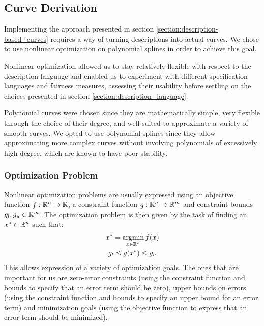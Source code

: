 \documentclass[a4paper]{article}
\begin{document}
		\subsection{Curve Derivation}
		\label{section:curve_derivation}

			Implementing the approach presented in section \ref{section:description-based_curves} requires a way of turning descriptions into actual curves. We chose to use nonlinear optimization on polynomial splines in order to achieve this goal.

			Nonlinear optimization allowed us to stay relatively flexible with respect to the description language and enabled us to experiment with different specification languages and fairness measures, assessing their usability before settling on the choices presented in section \ref{section:description_language}.

			Polynomial curves were chosen since they are mathematically simple, very flexible through the choice of their degree, and well-suited to approximate a variety of smooth curves. We opted to use polynomial splines since they allow approximating more complex curves without involving polynomials of excessively high degree, which are known to have poor stability.

			\subsubsection{Optimization Problem}
			\label{section:optimization_problem}

				Nonlinear optimization problems are usually expressed using an objective function \(f : \mathbb{R}^{n} \rightarrow \mathbb{R}\), a constraint function \(g : \mathbb{R}^{n} \rightarrow \mathbb{R}^{m}\) and constraint bounds \(g_l, g_u \in \mathbb{R}^{m}\). The optimization problem is then given by the task of finding an \(x^* \in \mathbb{R}^{n}\) such that:
				\begin{equation*}
					\begin{gathered}
						x^* = \operatorname*{argmin}_{x \in \mathbb{R}^{n}} f\!\left( x \right)\\
						g_l \leq g\!\left( x^* \right) \leq g_u
					\end{gathered}
				\end{equation*}
				This allows expression of a variety of optimization goals. The ones that are important for us are zero-error constraints (using the constraint function and bounds to specify that an error term should be zero), upper bounds on errors (using the constraint function and bounds to specify an upper bound for an error term) and minimization goals (using the objective function to express that an error term should be minimized).
\end{document}
